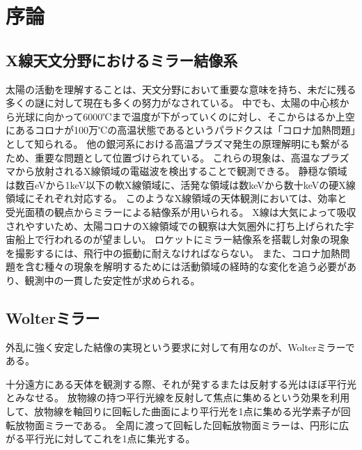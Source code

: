 \chapter{序論}
\thispagestyle{empty}
\label{chap1}
\graphicspath{{chap1/figure/}}
\minitoc


\newpage
\section{X線天文分野におけるミラー結像系}
\label{chap1_imaging_mirror_in_astronomy}

太陽の活動を理解することは、天文分野において重要な意味を持ち、未だに残る多くの謎に対して現在も多くの努力がなされている。
中でも、太陽の中心核から光球に向かって6000℃まで温度が下がっていくのに対し、そこからはるか上空にあるコロナが100万℃の高温状態であるというパラドクスは「コロナ加熱問題」として知られる。
他の銀河系における高温プラズマ発生の原理解明にも繋がるため、重要な問題として位置づけられている。\cite{ShimizuToshifumi2018}
これらの現象は、高温なプラズマから放射されるX線領域の電磁波を検出することで観測できる。
静穏な領域は数百eVから1keV以下の軟X線領域に、活発な領域は数keVから数十keVの硬X線領域にそれぞれ対応する。
このようなX線領域の天体観測においては、効率と受光面積の観点からミラーによる結像系が用いられる。
X線は大気によって吸収されやすいため、太陽コロナのX線領域での観察は大気圏外に打ち上げられた宇宙船上で行われるのが望ましい。
ロケットにミラー結像系を搭載し対象の現象を撮影するには、飛行中の振動に耐えなければならない。
また、コロナ加熱問題を含む種々の現象を解明するためには活動領域の経時的な変化を追う必要があり、観測中の一貫した安定性が求められる。

\clearpage
\newpage

\section{Wolterミラー}
\label{chap1_wolter_mirror}

外乱に強く安定した結像の実現という要求に対して有用なのが、Wolterミラーである。\cite{1952AnP...445...94W}

十分遠方にある天体を観測する際、それが発するまたは反射する光はほぼ平行光とみなせる。
放物線の持つ平行光線を反射して焦点に集めるという効果を利用して、放物線を軸回りに回転した曲面により平行光を1点に集める光学素子が回転放物面ミラーである。
全周に渡って回転した回転放物面ミラーは、円形に広がる平行光に対してこれを1点に集光する。

